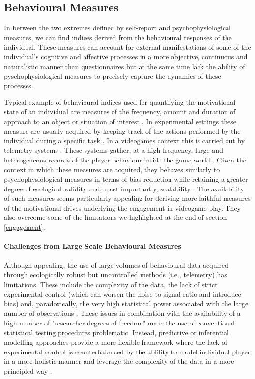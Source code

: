 \subsection{Behavioural Measures}
\label{behavioural_indices}
In between the two extremes defined by self-report and psychophysiological measures, we can find indices derived from the behavioural responses of the individual. These measures can account for external manifestations of some of the individual's cognitive and affective processes in a more objective, continuous and naturalistic manner than questionnaires but at the same time lack the ability of pyschophysiological measures to precisely capture the dynamics of these processes. 

Typical example of behavioural indices used for quantifying the motivational state of an individual are measures of the frequency, amount and duration of approach to an object or situation of interest \cite{berridge2004motivation, simpson2016behavioral}. In experimental settings these measure are usually acquired by keeping track of the actions performed by the individual during a specific task \cite{berridge2009dissecting, simpson2016behavioral}. In a videogames context this is carried out by telemetry systems \cite{el2016game}. These systems gather, at a high frequency,  large and heterogeneous records of the player behaviour inside the game world \cite{el2016game}. Given the context in which these measures are acquired, they behaves similarly to psychophysiological measures in terms of bias reduction while retaining a greater degree of ecological validity and, most importantly, scalability \cite{el2016game}. The availability of such measures seems particularly appealing for deriving more faithful measures of the motivational drives underlying the engagement in videogame play. They also overcome some of the limitations we highlighted at the end of section \ref{engagement}.
    
\paragraph*{Challenges from Large Scale Behavioural Measures}
\label{challenges_large_scale}
Although appealing, the use of large volumes of behavioural data acquired through ecologically robust but uncontrolled methods (i.e., telemetry) has limitations. These include the complexity of the data, the lack of strict experimental control (which can worsen the noise to signal ratio and introduce bias) and, paradoxically,  the very high statistical power associated with the large number of observations \cite{orben2019association}. These issues in combination with the availability of a high number of "researcher degrees of freedom" \cite{simmons2016false} make the use of conventional statistical testing procedures problematic. Instead, predictive or inferential modelling approaches provide a more flexible framework where the lack of experimental control is counterbalanced by the ablility to model individual player in a more holistic manner and leverage the complexity of the data in a more principled way \cite{yannakakis2013player}.


